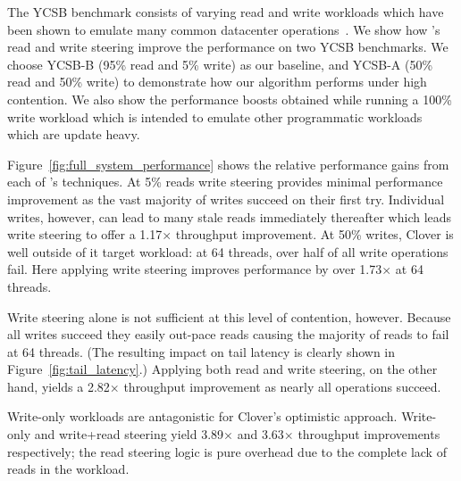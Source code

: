 The YCSB benchmark consists of varying read and write workloads which
have been shown to emulate many common datacenter
operations~\cite{ycsb}. We show how \sword's read and write steering
improve the
performance on two
YCSB benchmarks. We choose YCSB-B (95\% read and 5\% write) as our baseline, and
YCSB-A (50\% read and 50\% write) to demonstrate how our algorithm performs
under high contention.  We also show the performance boosts obtained while
running a 100\% write workload which is intended to emulate other programmatic
workloads which are update heavy.

Figure~\ref{fig:full_system_performance} shows the relative
performance gains from each of \sword's techniques. At 5\% reads write
steering provides minimal performance improvement as the vast majority
of writes succeed on their first try. Individual writes, however, can
lead to many stale reads immediately thereafter which leads write steering
to offer a 1.17$\times$ throughput improvement.
%
%
At 50\% writes, Clover is well outside of it target workload:
at 64 threads, over half of all write operations fail. Here applying write
steering improves performance by over 1.73$\times$ at 64 threads.

Write steering alone is not sufficient at this level of contention,
however.  Because all writes succeed they easily out-pace reads causing
the majority of reads to fail at 64 threads.  (The resulting impact on
tail latency is clearly shown in Figure~\ref{fig:tail_latency}.)
Applying both read and write steering, on the other hand, yields a
2.82$\times$ throughput improvement as nearly all operations
succeed.


Write-only workloads are antagonistic for Clover's optimistic
approach.  Write-only and write+read steering yield 3.89$\times$ and
3.63$\times$ throughput improvements respectively; the read steering
logic is pure overhead due to the complete lack of reads in the
workload.




